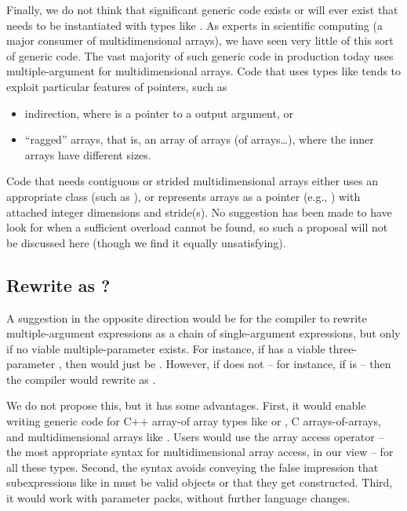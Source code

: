 \documentclass{wg21}
\begin{document}
Finally, we do not think that significant generic code exists or will ever exist that needs to be instantiated with types like .  As experts in scientific computing (a major consumer of multidimensional arrays), we have seen very little of this sort of generic code.  The vast majority of such generic code in production today uses multiple-argument  for multidimensional arrays.  Code that uses types like  tends to exploit particular features of pointers, such as
\begin{itemize}
\item indirection, where  is a pointer to a  output argument, or
\item ``ragged'' arrays, that is, an array of arrays (of arrays\ldots), where the inner arrays have different sizes.
\end{itemize}
Code that needs contiguous or strided multidimensional arrays either uses an appropriate class (such as ), or represents arrays as a pointer (e.g., ) with attached integer dimensions and stride(s).  No suggestion has been made to have  look for  when a sufficient  overload cannot be found, so such a proposal will not be discussed here (though we find it equally unsatisfying).

\subsection{Rewrite  as ?}

A suggestion in the opposite direction would be for the compiler to rewrite multiple-argument  expressions as a chain of single-argument  expressions, but only if no viable multiple-parameter  exists.  For instance, if  has a viable three-parameter , then  would just be .  However, if  does not -- for instance, if  is  -- then the compiler would rewrite  as .

We do not propose this, but it has some advantages.  First, it would enable writing generic code for C++ array-of array types like  or , C arrays-of-arrays, and multidimensional arrays like .  Users would use the array access operator -- the most appropriate syntax for multidimensional array access, in our view -- for all these types.  Second, the syntax avoids conveying the false impression that subexpressions like  in  must be valid objects or that they get constructed.  Third, it would work with parameter packs, without further language changes.
\end{document}
